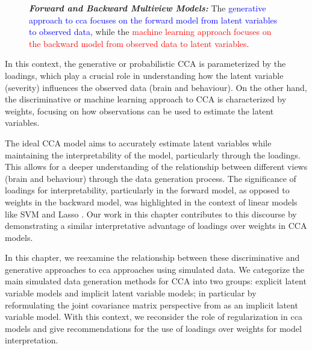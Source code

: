 \begin{figure}
    \centering
    \caption[Forward and Backward Multiview Models]{\textit{\textbf{Forward and Backward Multiview Models:}} The \textcolor{blue}{generative approach to \acrshort{cca} focuses on the forward model from latent variables to observed data}, while the \textcolor{red}{machine learning approach focuses on the backward model from observed data to latent variables}.}\label{fig:forward-backward-models}
\end{figure}

In this context, the generative or probabilistic CCA is parameterized by the \gls{loadings}, which play a crucial role in understanding how the latent variable (severity) influences the observed data (brain and behaviour).
On the other hand, the discriminative or machine learning approach to CCA is characterized by \gls{weights}, focusing on how observations can be used to estimate the latent variables.

The ideal CCA model aims to accurately estimate latent variables while maintaining the interpretability of the model, particularly through the loadings.
This allows for a deeper understanding of the relationship between different views (brain and behaviour) through the data generation process.
The significance of loadings for interpretability, particularly in the forward model, as opposed to weights in the backward model, was highlighted in the context of linear models like SVM and Lasso \citep{haufe2014interpretation}.
Our work in this chapter contributes to this discourse by demonstrating a similar interpretative advantage of loadings over weights in CCA models.

In this chapter, we reexamine the relationship between these discriminative and generative approaches to \acrshort{cca} approaches using simulated data.
We categorize the main simulated data generation methods for CCA into two groups: explicit latent variable models and implicit latent variable models; in particular by reformulating the joint covariance matrix perspective from \citet{suo2017sparse, chen2013sparse} as an implicit latent variable model.
With this context, we reconsider the role of regularization in \acrshort{cca} models and give recommendations for the use of loadings over weights for model interpretation.

